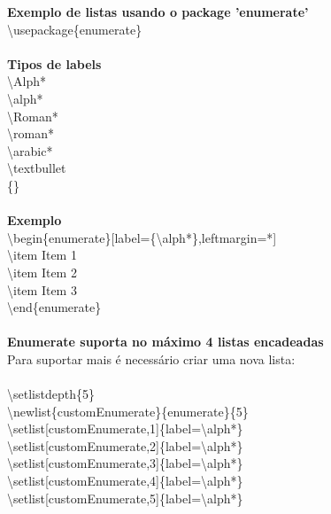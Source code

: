 \documentclass[12pt,a4paper]{article}
\begin{document}
\noindent{}\textbf{Exemplo de listas usando o package 'enumerate'}\\
\textbackslash{}usepackage\{enumerate\}\\
\\
\textbf{Tipos de labels}\\
\textbackslash{}Alph*\\
\textbackslash{}alph*\\
\textbackslash{}Roman*\\
\textbackslash{}roman*\\
\textbackslash{}arabic*\\
\textbackslash{}textbullet\\
\{\}\\
\\
\textbf{Exemplo}\\
\textbackslash{}begin\{enumerate\}[label=\{\textbackslash{}alph*\},leftmargin=*]\\
	\textbackslash{}item Item 1\\
	\textbackslash{}item Item 2\\
	\textbackslash{}item Item 3\\
\textbackslash{}end\{enumerate\}\\
\\
\textbf{Enumerate suporta no máximo 4 listas encadeadas}\\
Para suportar mais é necessário criar uma nova lista:\\
\\
\textbackslash{}setlistdepth\{5\}\\
\textbackslash{}newlist\{customEnumerate\}\{enumerate\}\{5\}\\
\textbackslash{}setlist[customEnumerate,1]\{label=\textbackslash{}alph*\}\\
\textbackslash{}setlist[customEnumerate,2]\{label=\textbackslash{}alph*\}\\
\textbackslash{}setlist[customEnumerate,3]\{label=\textbackslash{}alph*\}\\
\textbackslash{}setlist[customEnumerate,4]\{label=\textbackslash{}alph*\}\\
\textbackslash{}setlist[customEnumerate,5]\{label=\textbackslash{}alph*\}\\
\\


\end{document}
